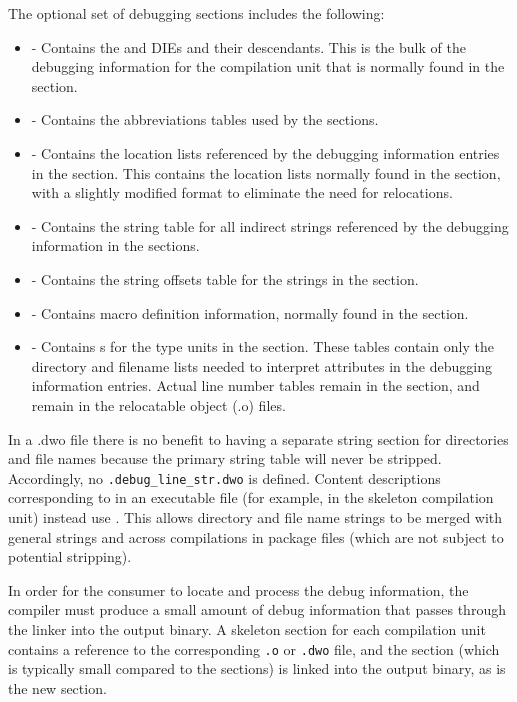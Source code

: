 The optional set of debugging sections includes the following:
\begin{itemize}
\item
\dotdebuginfodwo{} - Contains the \DWTAGcompileunit{} and
\DWTAGtypeunit{} DIEs and
their descendants. This is the bulk of the debugging
information for the compilation unit that is normally found
in the \dotdebuginfo{} section.
\item
\dotdebugabbrevdwo{} - Contains the abbreviations tables used by
the \dotdebuginfodwo{} sections.
\item
\dotdebuglocdwo{} - Contains the location lists referenced by
the debugging information entries in the \dotdebuginfodwo{}
section. This contains the location lists normally found in 
the \dotdebugloc{} section,
with a slightly modified format to eliminate the need for
relocations.
\item
\dotdebugstrdwo{} - Contains the string table for all indirect
strings referenced by the debugging information in the
\dotdebuginfodwo{} sections.
\item
\dotdebugstroffsetsdwo{} - Contains the string offsets table
for the strings in the \dotdebugstrdwo{}{} section.
\item
\dotdebugmacrodwo{} - Contains macro definition information,
normally found in the \dotdebugmacro{} section.
\item
\dotdebuglinedwo{} - Contains s 
for the type units in the \dotdebuginfodwo{} section. These tables
contain only the directory and filename lists needed to
interpret \DWATdeclfile{} attributes in the debugging
information entries. Actual line number tables remain in the
\dotdebugline{} section, and remain in the relocatable object
(.o) files.

\end{itemize}

In a .dwo file there is no benefit to having a separate string
section for directories and file names because the primary
string table will never be stripped. Accordingly, no
\texttt{.debug\_line\_str.dwo} is defined. Content descriptions corresponding
to \DWFORMlinestrp{} in an executable file (for example, in the
skeleton compilation unit) instead use \DWFORMstrx. This allows
directory and file name strings to be merged with general
strings and across compilations in package files (which are not
subject to potential stripping).



In order for the consumer to locate and process the debug
information, the compiler must produce a small amount of debug
information that passes through the linker into the output
binary. A skeleton \dotdebuginfo{} section for each compilation unit
contains a reference to the corresponding \texttt{.o} or \texttt{.dwo}
file, and the \dotdebugline{} section (which is typically small
compared to the \dotdebuginfo{} sections) is
linked into the output binary, as is the new \dotdebugaddr{}
section.

